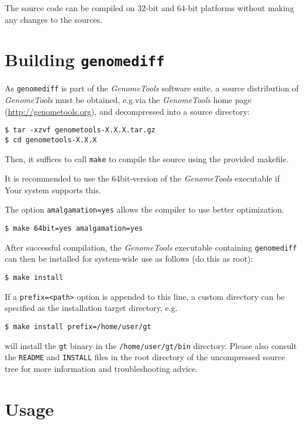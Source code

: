 \documentclass[12pt,titlepage]{article}
\newcommand{\Gdiff}{\texttt{genomediff}\xspace}
\newcommand{\GenomeTools}{\textit{GenomeTools}\xspace}
\newcommand{\Gt}{\texttt{gt}\xspace}
\newcommand{\File}[1]{\texttt{\small #1}}
\begin{document}
The source code can be compiled on 32-bit and 64-bit platforms without making
any changes to the sources.

\section{Building \Gdiff} \label{Building}

As \Gdiff is part of the \GenomeTools software suite, a source distribution of
\GenomeTools must be obtained, e.g.\@ via the \GenomeTools home page
(\url{http://genometools.org}), and decompressed into a source directory:

\begin{lstlisting}
$ tar -xzvf genometools-X.X.X.tar.gz
$ cd genometools-X.X.X
\end{lstlisting}

Then, it suffices to call \lstinline{make} to compile the source using the provided
makefile.

It is recommended to use the 64bit-version of the \GenomeTools executable if
Your system supports this.

The option \lstinline!amalgamation=yes! allows the compiler to use better
optimization.

\begin{lstlisting}
$ make 64bit=yes amalgamation=yes
\end{lstlisting}

After successful compilation, the \GenomeTools executable containing \Gdiff
can then be installed for system-wide use as follows (do this as root):

\begin{lstlisting}
$ make install
\end{lstlisting}%

If a \texttt{prefix=<path>} option is appended to this line, a custom directory
can be specified as the installation target directory, e.g.\@

\begin{lstlisting}
$ make install prefix=/home/user/gt
\end{lstlisting}%

will install the \Gt binary in the \File{/home/user/gt/bin} directory. Please
also consult the \File{README} and \File{INSTALL} files in the root
directory of the uncompressed source tree for more information and
troubleshooting advice.

\section{Usage}
\end{document}
